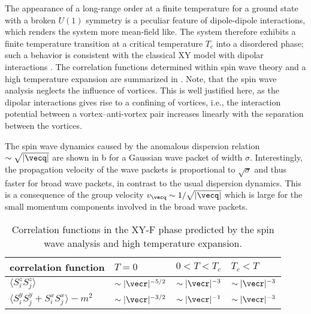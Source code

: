 The appearance of a long-range order at a finite temperature for a ground state with a broken $U(1)$ symmetry is
a peculiar feature of dipole-dipole interactions, which renders the system more mean-field like. The system therefore
exhibits a finite temperature transition at a critical temperature $T_{c}$ into a disordered phase; such a behavior is
consistent with the classical XY model with dipolar interactions \cite{Bruno2001}. The correlation functions determined
within spin wave theory and a high temperature expansion are summarized in .
 Note, that the spin wave analysis neglects the influence of vortices. This is well justified here,
as the dipolar interactions gives rise to a confining of vortices, i.e., the interaction potential
between a vortex--anti-vortex pair increases linearly with the separation between the vortices.

The spin wave dynamics caused by the anomalous dispersion relation $\sim \sqrt{|{\vecq}|}$ are shown in b for a Gaussian wave packet of width $\sigma$. Interestingly, the propagation velocity of the wave packets is proportional to $\sqrt{\sigma}$ and thus faster for broad wave packets, in contrast to the usual dispersion dynamics. This is a consequence of the group velocity $v_{\vecq} \sim 1/\sqrt{|{\vecq}|}$ which is large for the small momentum components involved in the broad wave packets.

\begin{table}
    \centering
    \begin{tabu} to .8\textwidth {X[1.8]X[c]X[c]X[c]}
        \toprule
        correlation function & $T=0$ & $0 < T < T_{c}$ & $T_{c}< T$ \\
        \midrule
        $ \langle S^{z}_{i} S^{z}_{j}\rangle$  &$ \sim |{\vecr}|^{-5/2}$  & $\sim |{\vecr}|^{-3}$ &  $\sim |{\vecr}|^{-3}$ \\
        $ \langle S^{y}_{i} S^{y}_{j}+ S^{x}_{i} S^{x}_{j}\rangle- m^2$  &$ \sim |{\vecr}|^{-3/2}$ &  $\sim |{\vecr}|^{-1}$ &  $\sim |{\vecr}|^{-3}$ \\
        \bottomrule
    \end{tabu}
    \caption{Correlation functions in the XY-F phase predicted by the spin wave analysis and high temperature expansion.}
\end{table}


